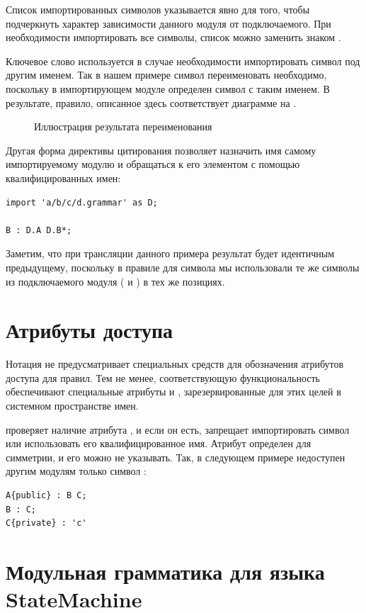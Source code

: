 Список импортированных символов указывается явно для того, чтобы подчеркнуть характер зависимости данного модуля от подключаемого. При необходимости импортировать все символы, список можно заменить знаком \code{\{*\}}.

Ключевое слово  используется в случае необходимости импортировать символ под другим именем. Так в нашем примере символ  переименовать необходимо, поскольку в импортирующем модуле определен символ с таким именем. В результате, правило, описанное здесь соответствует диаграмме на .

\begin{figure}[htbp]
	\caption{Иллюстрация результата переименования}\label{GRenaming}
\end{figure}

Другая форма директивы цитирования позволяет назначить имя самому импортируемому модулю и обращаться к его элементом с помощью квалифицированных имен:
\begin{lstlisting}
import 'a/b/c/d.grammar' as D;

B : D.A D.B*;
\end{lstlisting}  
Заметим, что при трансляции данного примера результат будет идентичным предыдущему, поскольку в правиле для символа  мы использовали те же символы из подключаемого модуля ( и ) в тех же позициях.

\section{Атрибуты доступа}

Нотация  не предусматривает специальных средств для обозначения атрибутов доступа для правил. Тем не менее, соответствующую функциональность обеспечивают специальные атрибуты  и , зарезервированные для этих целей в системном пространстве имен.

 проверяет наличие атрибута , и если он есть, запрещает импортировать символ или использовать его квалифицированное имя. Атрибут  определен для симметрии, и его можно не указывать. Так, в следующем примере недоступен другим модулям только символ :
\begin{lstlisting}
A{public} : B C;
B : C;
C{private} : 'c'
\end{lstlisting}  

\section{Модульная грамматика для языка StateMachine}\label{ModularSMG}

